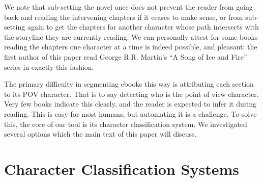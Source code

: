 \documentclass[11pt,a4paper]{article}
\begin{document}
We note that sub-setting the novel once does not prevent the reader from going back and reading the intervening chapters if it ceases to make sense, or from sub-setting again to get the chapters for another character whose path intersects with the storyline they are currently reading.
We can personally attest for some books reading the chapters one character at a time is indeed possible, and pleasant: the first author of this paper read George R.R. Martin's ``A Song of Ice and Fire'' series in exactly this fashion.


The primary difficulty in segmenting ebooks this way is attributing each section to its POV character.
That is to say detecting who is the point of view character.
Very few books indicate this clearly, and the reader is expected to infer it during reading.
This is easy for most humans, but automating it is a challenge.
To solve this, the core of our tool is its character classification system.
We investigated several options which the main text of this paper will discuss.


\section{Character Classification Systems}
\end{document}
